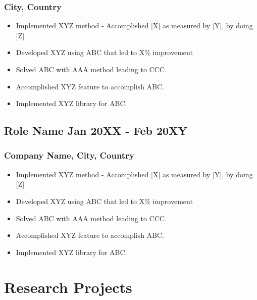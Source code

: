 \documentclass[11pt]{article}
\begin{document}
    \subsubsection{City, Country}
    \begin{itemize}
        \item[\checkmark] Implemented XYZ method - Accomplished [X] as measured by [Y], by doing [Z] 
        \item[\checkmark]  Developed XYZ using ABC that led to X\% improvement 
        \item[\checkmark] Solved ABC with AAA method leading to CCC.
        \item[\checkmark]  Accomplished XYZ feature to accomplish ABC.
        \item[\checkmark]  Implemented XYZ library for ABC.
    \end{itemize}
    
    \subsection{Role Name \hfill \normalfont Jan 20XX - Feb 20XY}
    \subsubsection{Company Name, City, Country}
    \begin{itemize}
        \item[\checkmark] Implemented XYZ method - Accomplished [X] as measured by [Y], by doing [Z] 
        \item[\checkmark]  Developed XYZ using ABC that led to X\% improvement 
        \item[\checkmark] Solved ABC with AAA method leading to CCC.
        \item[\checkmark]  Accomplished XYZ feature to accomplish ABC.
        \item[\checkmark]  Implemented XYZ library for ABC.
    \end{itemize}

    \section{Research Projects}
\end{document}
